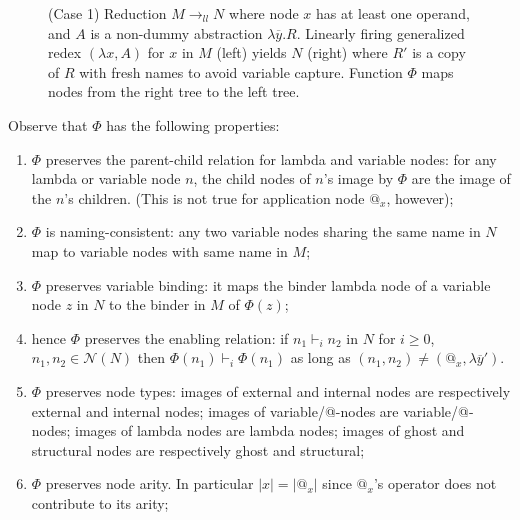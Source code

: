 \documentclass{elsarticle}
\theoremstyle{plain}
\theoremstyle{definition}
\newcommand\Nodes{\mathcal{N}}%
\newcommand{\enables}{\vdash} %
\newcommand{\llred}{\rightarrow_{ll}}
\begin{document}
\begin{description}[itemindent=0em,leftmargin=0cm]
\begin{figure}[htbp]
    \caption{(Case 1) Reduction $M\llred N$ where node $x$ has at least one operand, and $A$ is a non-dummy
     abstraction $\lambda\overline{y} . R$. Linearly firing  generalized redex $(\lambda x, A)$ for $x$ in $M$ (left)
     yields $N$ (right) where $R'$ is a copy of $R$ with fresh names to avoid variable capture.
    Function $\Phi$ maps nodes from the right tree to the left tree.}
    \label{fig:firing_genredex_effect_on_tree_with_operands_and_lambda_argument}
    \end{figure}


Observe that $\Phi$ has the following properties:
\begin{enumerate}[label=(\roman*)]
    \item $\Phi$ preserves the parent-child relation for lambda and variable nodes: for any lambda or variable node $n$, the child nodes of $n$'s image by $\Phi$ are the image of the $n$'s children. (This is not true for application node $@_x$, however);

    \item $\Phi$ is naming-consistent: any two variable nodes sharing the same name  in $N$ map to variable nodes with same name in $M$;

    \item $\Phi$ preserves variable binding: it maps the binder lambda node of a variable node $z$ in $N$ to the binder in $M$ of $\Phi(z)$;

    \item hence $\Phi$ preserves the enabling relation: if $n_1 \enables_i n_2$ in $N$ for $i\geq 0$, $n_1,n_2 \in \Nodes(N)$ then $\Phi(n_1) \enables_i \Phi(n_1)$ as long as $(n_1,n_2) \neq (@_x,\lambda\overline{y}')$.

    \item $\Phi$ preserves node types: images of external and internal nodes are respectively external and internal nodes; images of variable/@-nodes are variable/@-nodes; images of lambda nodes are lambda nodes; images of ghost and structural nodes are respectively ghost and structural;

    \item $\Phi$ preserves node arity. In particular $|x| = |@_x|$ since $@_x$'s operator does not contribute to its arity;


\end{enumerate}
\end{description}
\end{document}
